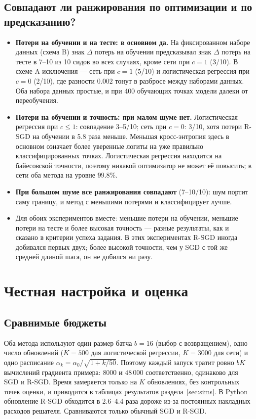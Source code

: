 \documentclass[11pt,a4paper]{article}
\begin{document}
\subsection{Совпадают ли ранжирования по оптимизации и по предсказанию?}\label{sec:ranking}

\begin{itemize}
\item \textbf{Потери на обучении и на тесте: в основном да.} На фиксированном наборе данных
(схема B) знак $\Delta$ потерь на обучении предсказывал знак $\Delta$ потерь на тесте в 7--10 из
10 сидов во всех случаях, кроме сети при $c=1$ (3/10). В схеме A исключения — сеть при $c=1$
(5/10) и логистическая регрессия при $c=0$ (2/10), где разности $0.002$ тонут в разбросе между
наборами данных. Оба набора данных простые, и при 400 обучающих точках модели далеки от
переобучения.
\item \textbf{Потери на обучении и точность: при малом шуме нет.} Логистическая регрессия при
$c\le1$: совпадение 3--5/10; сеть при $c=0$: 3/10, хотя потери R-SGD на обучении в 5.8 раза
меньше. Меньшая кросс-энтропия здесь в основном означает более уверенные логиты на уже
правильно классифицированных точках. Логистическая регрессия находится на байесовской
точности, поэтому никакой оптимизатор не может её повысить; в сети оба метода на уровне $99.8\%$.
\item \textbf{При большом шуме все ранжирования совпадают} (7--10/10): шум портит саму границу, и
метод с меньшими потерями и классифицирует лучше.
\item Для обоих экспериментов вместе: меньшие потери на обучении, меньшие потери на тесте и
более высокая точность — разные результаты, как и сказано в критерии успеха задания. В этих
экспериментах R-SGD иногда добивался первых двух; более высокой точности, чем у SGD с той же
средней длиной шага, он не добился ни разу.
\end{itemize}

\section{Честная настройка и оценка}\label{sec:protocol}

\subsection{Сравнимые бюджеты}
Оба метода используют один размер батча $b=16$ (выбор с возвращением), одно число обновлений
($K=500$ для логистической регрессии, $K=3000$ для сети) и одно расписание
$\alpha_k=\alpha_0/\sqrt{1+k/50}$. Поэтому каждый запуск тратит ровно $bK$ вычислений градиента
примера: $8000$ и $48\,000$ соответственно, одинаково для SGD и R-SGD. Время замеряется только на
$K$ обновлениях, без контрольных точек оценки, и приводится в таблицах результатов
раздела~\ref{sec:sims}. В Python обновление R-SGD обходится в 2.6--4.4 раза дороже из-за
постоянных накладных расходов решателя. Сравниваются только обычный SGD и R-SGD.
\end{document}

